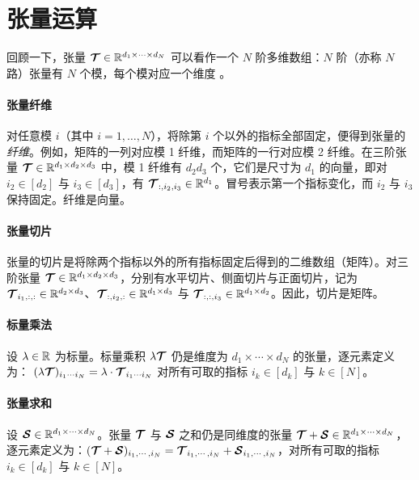 \section{张量运算}\label{chapter:operations}
回顾一下，张量 $\bm{\mathcal{T}} \in \mathbb{R}^{d_1 \times \cdots \times d_N}$ 可以看作一个 $N$ 阶多维数组：$N$ 阶（亦称 $N$ 路）张量有 $N$ 个模，每个模对应一个维度 \citep{kolda2009tensor}。
\paragraph{张量纤维} 对任意模 $i$（其中 $i = 1, \dots, N$），将除第 $i$ 个以外的指标全部固定，便得到张量的\textit{纤维}。例如，矩阵的一列对应模 1 纤维，而矩阵的一行对应模 2 纤维。在三阶张量 $\bm{\mathcal{T}} \in \mathbb{R}^{d_1 \times d_2 \times d_3}$ 中，模 1 纤维有 $d_2d_3$ 个，它们是尺寸为 $d_1$ 的向量，即对 $i_2 \in [d_2]$ 与 $i_3 \in [d_3]$，有 $\bm{\mathcal{T}}_{:,i_2,i_3} \in \mathbb{R}^{d_1}$。冒号表示第一个指标变化，而 $i_2$ 与 $i_3$ 保持固定。纤维是向量。
\paragraph{张量切片} 张量的切片是将除两个指标以外的所有指标固定后得到的二维数组（矩阵）。对三阶张量 $\bm{\mathcal{T}} \in \mathbb{R}^{d_1 \times d_2 \times d_3}$，分别有水平切片、侧面切片与正面切片，记为 $\bm{\mathcal{T}}_{i_1,:,:} \in \mathbb{R}^{d_2 \times d_3}$、$\bm{\mathcal{T}}_{:,i_2,:} \in \mathbb{R}^{d_1 \times d_3}$ 与 $\bm{\mathcal{T}}_{:,:,i_3} \in \mathbb{R}^{d_1 \times d_2}$。因此，切片是矩阵。
\paragraph{标量乘法} 
设 $\lambda \in \mathbb{R}$ 为标量。标量乘积 $\lambda\bm{\mathcal{T}}$ 
 仍是维度为 $d_1 \times \cdots \times d_N$ 的张量，逐元素定义为：
$
    (\lambda\bm{\mathcal{T}})_{i_1 \cdots i_N} = \lambda \cdot \bm{\mathcal{T}}_{i_1 \cdots i_N}$
对所有可取的指标 $i_k\in[d_k]$ 与 $k\in[N]$。
\paragraph{张量求和} 设 $\bm{\mathcal{S}}\in\mathbb{R}^{d_1\times\cdots\times d_N}$。张量 $\bm{\mathcal{T}}$ 与 $\bm{\mathcal{S}}$ 之和仍是同维度的张量 $\bm{\mathcal{T}}+\bm{\mathcal{S}}\in\mathbb{R}^{d_1\times\cdots\times d_N}$，逐元素定义为：$(\bm{\mathcal{T}}+\bm{\mathcal{S}})_{i_1,\cdots,i_N} = \bm{\mathcal{T}}_{i_1,\cdots,i_N} + \bm{\mathcal{S}}_{i_1,\cdots,i_N}$，对所有可取的指标 $i_k\in[d_k]$ 与 $k\in[N]$。

